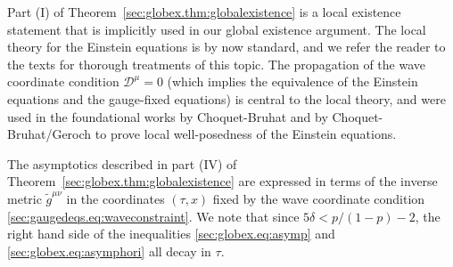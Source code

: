 \documentclass{article}
\newcommand{\mc}{\mathcal}
\newcommand{\wt}{\widetilde}
\begin{document}
\begin{remark}
    Part (I) of Theorem~\ref{sec:globex.thm:globalexistence} is a local existence statement that is implicitly used in our global existence argument. The local theory for the Einstein equations is by now standard, and we refer the reader to the texts \cite{Rin:Cauchyproblembook:09,Cho:grbook:15} for thorough treatments of this topic. The propagation of the wave coordinate condition $\mc{D}^{\mu} = 0$ (which implies the equivalence of the Einstein equations and the gauge-fixed equations) is central to the local theory, and were used in the foundational works \cite{Cho:Einsteinlwp:52} by Choquet-Bruhat and \cite{ChoGer:mghd:69} by Choquet-Bruhat/Geroch to prove local well-posedness of the Einstein equations.
\end{remark}
\begin{remark}[Asymptotics]\label{sec:globex.rmk:asymptotics}
    The asymptotics described in part (IV) of Theorem~\ref{sec:globex.thm:globalexistence} are expressed in terms of the inverse metric $\wt{g}^{\mu\nu}$ in the coordinates $(\tau,x)$ fixed by the wave coordinate condition \eqref{sec:gaugedeqs.eq:waveconstraint}. We note that since $5\delta < p/(1-p)-2$, the right hand side of the inequalities \eqref{sec:globex.eq:asymp} and \eqref{sec:globex.eq:asymphori} all decay in $\tau$.
    

\end{remark}
\end{document}
